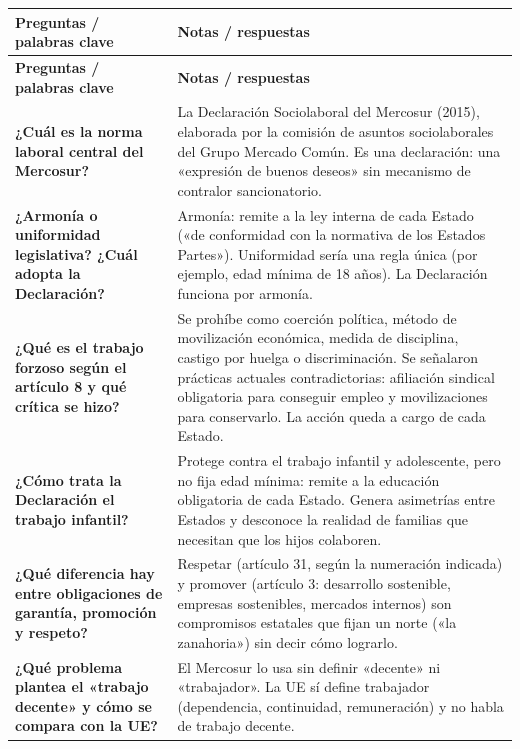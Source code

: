 \documentclass[12pt,oneside]{book}
\begin{document}
\begin{longtable}{L{0.27\textwidth}L{\tabcolsep\relax}}
\toprule
\textbf{Preguntas / palabras clave} & \textbf{Notas / respuestas} \\
\midrule
\endfirsthead
\toprule
\textbf{Preguntas / palabras clave} & \textbf{Notas / respuestas} \\
\midrule
\endhead

\textbf{¿Cuál es la norma laboral central del Mercosur?} &
La Declaración Sociolaboral del Mercosur (2015), elaborada por la comisión de asuntos sociolaborales del Grupo Mercado Común. Es una declaración: una «expresión de buenos deseos» sin mecanismo de contralor sancionatorio. \\[0.6em]

\textbf{¿Armonía o uniformidad legislativa? ¿Cuál adopta la Declaración?} &
Armonía: remite a la ley interna de cada Estado («de conformidad con la normativa de los Estados Partes»). Uniformidad sería una regla única (por ejemplo, edad mínima de 18 años). La Declaración funciona por armonía. \\[0.6em]

\textbf{¿Qué es el trabajo forzoso según el artículo 8 y qué crítica se hizo?} &
Se prohíbe como coerción política, método de movilización económica, medida de disciplina, castigo por huelga o discriminación. Se señalaron prácticas actuales contradictorias: afiliación sindical obligatoria para conseguir empleo y movilizaciones para conservarlo. La acción queda a cargo de cada Estado. \\[0.6em]

\textbf{¿Cómo trata la Declaración el trabajo infantil?} &
Protege contra el trabajo infantil y adolescente, pero no fija edad mínima: remite a la educación obligatoria de cada Estado. Genera asimetrías entre Estados y desconoce la realidad de familias que necesitan que los hijos colaboren. \\[0.6em]

\textbf{¿Qué diferencia hay entre obligaciones de garantía, promoción y respeto?} &
Respetar (artículo 31, según la numeración indicada) y promover (artículo 3: desarrollo sostenible, empresas sostenibles, mercados internos) son compromisos estatales que fijan un norte («la zanahoria») sin decir cómo lograrlo. \\[0.6em]

\textbf{¿Qué problema plantea el «trabajo decente» y cómo se compara con la UE?} &
El Mercosur lo usa sin definir «decente» ni «trabajador». La UE sí define trabajador (dependencia, continuidad, remuneración) y no habla de trabajo decente. \\[0.6em]


\end{longtable}
\end{document}
